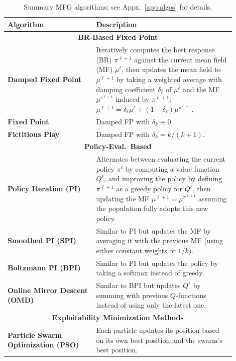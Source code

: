 \documentclass[10pt,twocolumn,letterpaper]{article}
\theoremstyle{definition}
\theoremstyle{remark}
\begin{document}
\begin{table}[t]
\centering
\small
\renewcommand{\arraystretch}{1.5}
\begin{tabular}{p{0.35\linewidth} p{0.55\linewidth}}
\hline
\textbf{Algorithm} & \textbf{Description} \\ \hline

\multicolumn{2}{c}{\cellcolor{darkgreen!5}\textbf{\color{darkgreen} BR-Based Fixed Point}} \\
\hline

\textbf{Damped Fixed Point} & 
Iteratively computes the best response (BR) $\pi^{\ell+1}$ against the current mean field (MF) $\mu^\ell$, then updates the mean field to $\mu^{\ell+1}$ by taking a weighted average with damping coefficient $\delta_\ell$ of $\mu^\ell$ and the MF $\mu^{\pi^{\ell+1}}$ induced by $\pi^{\ell+1}$:
$\mu^{\ell+1} = \delta_\ell \mu^\ell + (1-\delta_\ell)\mu^{\pi^{\ell+1}}$. 
\\ \hline

\textbf{Fixed Point} & 
Damped FP with $\delta_k \equiv 0$. 
\\ \hline

\textbf{Fictitious Play} & 
Damped FP with $\delta_k = k/(k+1)$. 
\\ \hline\hline

\multicolumn{2}{c}{\cellcolor{darkgreen!5}\textbf{\color{darkgreen} Policy-Eval.\ Based}} \\
\hline

\textbf{Policy Iteration (PI)} & 
Alternates between evaluating the current policy $\pi^\ell$ by computing a value function $Q^\ell$, and improving the policy by defining $\pi^{\ell+1}$ as a greedy policy for $Q^\ell$, then updating the MF $\mu^{\ell+1} = \mu^{\pi^{\ell+1}}$ assuming the population fully adopts this new policy. 
\\ \hline

\textbf{Smoothed PI (SPI)} & 
Similar to PI but updates the MF by averaging it with the previous MF (using either constant weights or $1/k$). 
\\ \hline

\textbf{Boltzmann PI (BPI)} & 
Similar to PI but updates the policy by taking a softmax instead of greedy. 
\\ \hline

\textbf{Online Mirror Descent (OMD)} & 
Similar to BPI but updates $Q^\ell$ by summing with previous $Q$-functions instead of using only the latest one. 
\\ \hline\hline

\multicolumn{2}{c}{\cellcolor{darkgreen!5}\textbf{\color{darkgreen} Exploitability Minimization Methods}} \\
\hline

\textbf{Particle Swarm Optimization (PSO)} & 
Each particle updates its position based on its own best position and the swarm's best position.
\\ \hline

\end{tabular}
\caption{Summary MFG algorithms; see Appx.~\ref{app:algos} for details.}
\label{tab:mfg_algorithms}
\vspace{-0.4cm}
\end{table}
\end{document}
